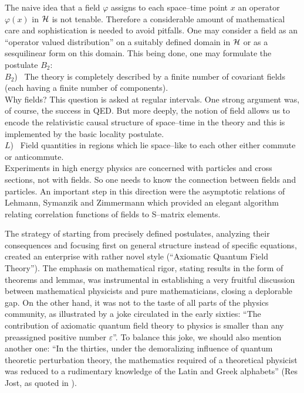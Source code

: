 \noindent 
The naive idea that a field $\varphi$ assigns to each space--time
point $x$ an operator $\varphi (x)$ in $\cal H$ is not tenable.
Therefore a
considerable amount of mathematical care and sophistication is needed
to avoid pitfalls. One may consider a field as an
 ``operator valued distribution'' on a suitably defined domain in $\cal
H$ or as a sesquilinear form on this domain. This being done, one may
formulate the postulate $B_2$:\\[2mm]
$B_2$) \  The theory is completely described by a finite number of covariant
fields (each having a finite number of components). \\[2mm]
\indent
Why fields? This question is asked at regular intervals. One strong
argument was, of course, the success in QED. But more deeply, the
notion of field allows us to encode the relativistic causal structure
of space--time in the theory and this is implemented by the basic
locality postulate.\\[2mm]
$L$) \ Field quantities in regions which lie space--like to 
each other either commute or
anticommute. \\[2mm]
\indent
Experiments in high energy physics are concerned with particles and
cross sections, not with fields. So one needs to know the connection
between fields and particles. An important step in this direction were
the asymptotic relations of Lehmann, Symanzik and Zimmermann 
\cite{LeSyZi} which
provided an elegant algorithm relating correlation functions of fields
to S--matrix elements.

The strategy of starting from precisely defined postulates, analyzing
their consequences and focusing first on general structure instead of
specific equations, created an enterprise with rather novel style
(``Axiomatic Quantum Field Theory''). The emphasis on mathematical
rigor, stating results in the form of theorems and lemmas, was
instrumental in establishing a very fruitful discussion between
mathematical \mbox{physicists} and pure mathematicians, closing a deplorable
gap. On the other hand, it was not to the taste of all parts of the
physics community, as illustrated by a joke circulated in the early
sixties: ``The contribution of axiomatic quantum field theory to
physics is smaller than any preassigned positive number
$\varepsilon$''. To balance this joke, we should also mention
another one: ``In the thirties, under the demoralizing influence
of quantum theoretic perturbation theory, the mathematics required
of a theoretical physicist was reduced to a rudimentary knowledge
of the Latin and Greek alphabets'' (Res Jost, as quoted in 
\cite{StWi}). 

